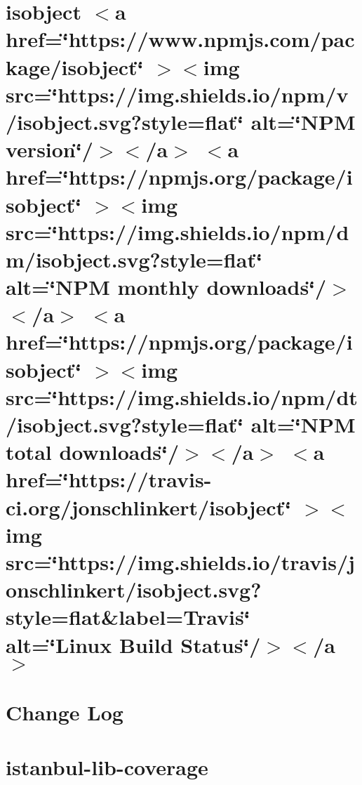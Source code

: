 \documentclass[twoside]{book}
\newcommand{\+}{\discretionary{\mbox{\scriptsize$\hookleftarrow$}}{}{}}
\begin{document}
\chapter{isobject \texorpdfstring{$<$}{<}a href=\char`\"{}https\+://www.\+npmjs.\+com/package/isobject\char`\"{} \texorpdfstring{$>$}{>}\texorpdfstring{$<$}{<}img src=\char`\"{}https\+://img.\+shields.\+io/npm/v/isobject.\+svg?style=flat\char`\"{} alt=\char`\"{}\+NPM version\char`\"{}/\texorpdfstring{$>$}{>}\texorpdfstring{$<$}{<}/a\texorpdfstring{$>$}{>} \texorpdfstring{$<$}{<}a href=\char`\"{}https\+://npmjs.\+org/package/isobject\char`\"{} \texorpdfstring{$>$}{>}\texorpdfstring{$<$}{<}img src=\char`\"{}https\+://img.\+shields.\+io/npm/dm/isobject.\+svg?style=flat\char`\"{} alt=\char`\"{}\+NPM monthly downloads\char`\"{}/\texorpdfstring{$>$}{>}\texorpdfstring{$<$}{<}/a\texorpdfstring{$>$}{>} \texorpdfstring{$<$}{<}a href=\char`\"{}https\+://npmjs.\+org/package/isobject\char`\"{} \texorpdfstring{$>$}{>}\texorpdfstring{$<$}{<}img src=\char`\"{}https\+://img.\+shields.\+io/npm/dt/isobject.\+svg?style=flat\char`\"{} alt=\char`\"{}\+NPM total downloads\char`\"{}/\texorpdfstring{$>$}{>}\texorpdfstring{$<$}{<}/a\texorpdfstring{$>$}{>} \texorpdfstring{$<$}{<}a href=\char`\"{}https\+://travis-\/ci.\+org/jonschlinkert/isobject\char`\"{} \texorpdfstring{$>$}{>}\texorpdfstring{$<$}{<}img src=\char`\"{}https\+://img.\+shields.\+io/travis/jonschlinkert/isobject.\+svg?style=flat\&label=\+Travis\char`\"{} alt=\char`\"{}\+Linux Build Status\char`\"{}/\texorpdfstring{$>$}{>}\texorpdfstring{$<$}{<}/a\texorpdfstring{$>$}{>}}
\label{md__c___users_vaishnavi_jadhav__desktop__developer_code_mean_stack_example_client_node_modules_isobject__r_e_a_d_m_e}

\chapter{Change Log}
\label{md__c___users_vaishnavi_jadhav__desktop__developer_code_mean_stack_example_client_node_modules_ia72ecac31722363b9d85b2e8beef95d6}

\chapter{istanbul-\/lib-\/coverage}
\label{md__c___users_vaishnavi_jadhav__desktop__developer_code_mean_stack_example_client_node_modules_i80753b315095658f3a4387e19737c09b}

\end{document}
